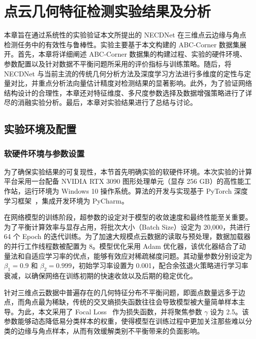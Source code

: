\chapter{点云几何特征检测实验结果及分析}
\label{chap:experiment}

本章旨在通过系统性的实验验证本文所提出的 NECDNet 在三维点云边缘与角点检测任务中的有效性与鲁棒性。实验主要基于本文构建的 ABC-Corner 数据集展开。首先，本章将详细阐述 ABC-Corner 数据集的构建过程、实验的硬件环境、参数配置以及针对数据不平衡问题所采用的评价指标与训练策略。随后，将 NECDNet 与当前主流的传统几何分析方法及深度学习方法进行多维度的定性与定量对比，并重点分析法向量估计精度对检测结果的显著影响。此外，为了验证网络结构设计的合理性，本章还对特征维度、多尺度参数选择及数据增强策略进行了详尽的消融实验分析。最后，本章对实验结果进行了总结与讨论。

\section{实验环境及配置}

\subsection{软硬件环境与参数设置}
\label{sec:experiment setup}

为了确保实验结果的可复现性，本节首先明确实验的软硬件环境。本次实验的计算平台采用一台配备 NVIDIA RTX 3090 图形处理单元（显存 256 GB）的高性能工作站，运行环境为 Windows 10 操作系统。算法的开发与实现基于 PyTorch 深度学习框架~\cite{paszke_pytorch_2019}，集成开发环境为 PyCharm。

在网络模型的训练阶段，超参数的设定对于模型的收敛速度和最终性能至关重要。为了平衡计算效率与显存占用，将批次大小（Batch Size）设定为 20,000，共进行 64 个 Epoch 的迭代训练。为了加速大规模点云数据的读取与预处理，数据加载器的并行工作线程数被配置为 8。模型优化采用 Adam 优化器，该优化器结合了动量法和自适应学习率的优点，能够有效应对稀疏梯度问题。其动量参数分别设定为 $\beta_1 = 0.9$ 和 $\beta_2 = 0.999$，初始学习率设置为 0.001，配合余弦退火策略进行学习率衰减，以确保网络在训练初期的快速收敛以及后期的稳定优化。

针对三维点云数据中普遍存在的几何特征分布不平衡问题，即面点数量远多于边点，而角点最为稀缺，传统的交叉熵损失函数往往会导致模型被大量简单样本主导。为此，本文采用了 Focal Loss~\cite{lin_focal_2020} 作为损失函数，并将聚焦参数 $\gamma$ 设为 2.5。该参数能够动态降低易分类样本的权重，使得模型在训练过程中更加关注那些难以分类的边缘与角点样本，从而有效缓解类别不平衡带来的负面影响。

